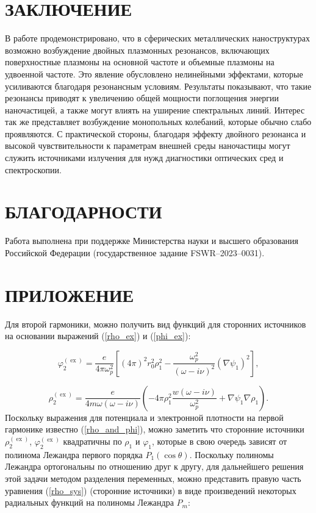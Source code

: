 \documentclass[12pt, a4paper]{article}
\def \w {\omega}
\def \ph {\varphi}
\def \ex { \operatorname{ex}}
\begin{document}
\section{ЗАКЛЮЧЕНИЕ}

В работе продемонстрировано, что в сферических металлических наноструктурах возможно возбуждение двойных плазмонных резонансов, включающих поверхностные плазмоны на основной частоте и объемные плазмоны на удвоенной частоте. Это явление обусловлено нелинейными эффектами, которые усиливаются благодаря резонансным условиям. Результаты показывают, что такие резонансы приводят к увеличению общей мощности поглощения энергии наночастицей, а также могут влиять на уширение спектральных линий. Интерес так же представляет возбуждение монопольных колебаний, которые обычно слабо проявляются. С практической стороны, благодаря эффекту двойного резонанса и высокой чувствительности к параметрам внешней среды наночастицы могут служить источниками излучения для нужд диагностики оптических сред и спектроскопии.

\section{БЛАГОДАРНОСТИ}
Работа выполнена при поддержке Министерства науки и высшего образования Российской Федерации (государственное задание FSWR–2023–0031).
\newpage

\appendix
\section*{\hfill ПРИЛОЖЕНИЕ}


Для второй гармоники, можно получить вид функций для сторонних источников на основании выражений (\ref{rho_ex}) и (\ref{phi_ex}):

\begin{equation} 	
 \ph^{(\ex)}_2 = \frac{e}{4 \pi \w_p^2}[(4\pi)^2r_0^2\rho_1^2 - \frac{\w_p^2}{(\w - i \nu)^2}(\nabla \psi_1)^2], 
\end{equation}

\begin{equation} 	
\rho^{(\ex)}_2 = \frac{e}{4 m \w(\w - i \nu)}(-4 \pi \rho_1^2 \frac{w(\w - i \nu)}{\w_p^2} + \nabla \psi_1\nabla \rho_1).
\end{equation}
Поскольку выражения для потенциала и электронной плотности на первой гармонике известно (\ref{rho_and_phi}), можно заметить что сторонние источники $\rho^{(\ex)}_2$, $\ph^{(\ex)}_2$ квадратичны по $\rho_1$ и $\ph_1$, которые в свою очередь зависят от полинома Лежандра первого порядка $P_1(\cos\theta)$. Поскольку полиномы Лежандра ортогональны по отношению друг к другу, для дальнейшего решения этой задачи методом разделения переменных, можно представить правую часть уравнения (\ref{rho_sys}) (сторонние источники) в виде произведений некоторых радиальных функций на
полиномы Лежандра $P_m$:
\end{document}
